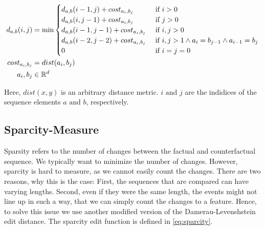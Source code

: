 \documentclass[./../../paper.tex]{subfiles}
\begin{document}
\begin{align}
    \label{eq:similarity}
    d_{a, b}(i, j) & =\min
    \begin{cases}
        d_{a, b}(i-1, j  )+cost_{a_i, b_j} & \text { if } i>0                                            \\
        d_{a, b}(i  , j-1)+cost_{a_i, b_j} & \text { if } j>0                                            \\
        d_{a, b}(i-1, j-1)+cost_{a_i, b_j} & \text { if } i, j>0                                         \\
        d_{a, b}(i-2, j-2)+cost_{a_i, b_j} & \text { if } i, j>1 \land a_{i}=b_{j-1} \land a_{i-1}=b_{j} \\
        0                                 & \text { if } i=j=0                                          
    \end{cases}         \\
    cost_{a_i, b_j}      & = dist(a_i, b_j) \\
    a_i,b_j        & \in \mathbb{R}^d
\end{align}

\noindent Here, $dist(x,y)$ is an arbitrary distance metric. $i \text{ and } j$ are the indidices of the sequence elements $a \text{ and } b$, respectively.

\subsection{Sparcity-Measure}
Sparsity refers to the number of changes between the factual and counterfactual sequence. We typically want to minimize the number of changes. However, sparcity is hard to measure, as we cannot easily count the changes. There are two reasons, why this is the case: First, the sequences that are compared can have varying lengths. Second, even if they were the same length, the events might not line up in such a way, that we can simply count the changes to a feature. Hence, to solve this issue we use another modified version of the Damerau-Levenshstein edit distance. The sparcity edit function is defined in \autoref{eq:sparcity}.
\end{document}
